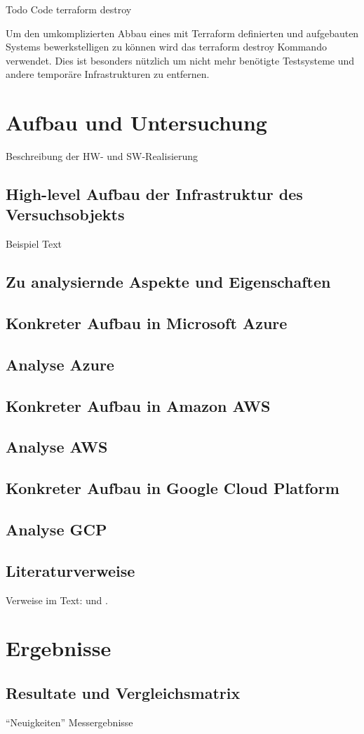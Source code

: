 Todo Code terraform destroy

Um den umkomplizierten Abbau eines mit Terraform definierten und aufgebauten
Systems bewerkstelligen zu können wird das terraform destroy Kommando
verwendet. Dies ist besonders nützlich um nicht mehr benötigte Testsysteme
und andere temporäre Infrastrukturen zu entfernen.

\chapter{Aufbau und Untersuchung}
\label{sec:real}
Beschreibung der HW- und SW-Realisierung

\section{High-level Aufbau der Infrastruktur des Versuchsobjekts}
\label{sec:real-unter}
Beispiel Text

\section{Zu analysiernde Aspekte und Eigenschaften}

\section{Konkreter Aufbau in Microsoft Azure}

\section{Analyse Azure}

\section{Konkreter Aufbau in Amazon AWS}

\section{Analyse AWS}

\section{Konkreter Aufbau in Google Cloud Platform}

\section{Analyse GCP}

\section{Literaturverweise}
\label{sec:real-literatur}

Verweise im Text: \cite{doc:stz} und \cite{doc:gun}.

\chapter{Ergebnisse}
\label{sec:ergeb}


\section{Resultate und Vergleichsmatrix}

\enquote{Neuigkeiten} Messergebnisse
